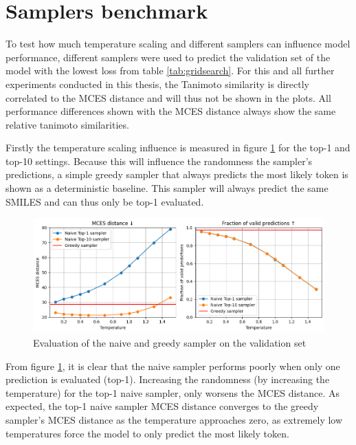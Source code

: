 \section{Samplers benchmark}

To test how much temperature scaling and different samplers can influence model performance, different samplers were used to predict the validation set of the model with the lowest loss from table \ref{tab:gridsearch}.
For this and all further experiments conducted in this thesis, the Tanimoto similarity is directly correlated to the MCES distance and will thus not be shown in the plots.
All performance differences shown with the MCES distance always show the same relative tanimoto similarities.

Firstly the temperature scaling influence is measured in figure \ref{fig:naive_and_greedy} for the top-1 and top-10 settings.
Because this will influence the randomness the sampler's predictions, a simple greedy sampler that always predicts the most likely token is shown as a deterministic baseline.
This sampler will always predict the same SMILES and can thus only be top-1 evaluated.

\begin{figure}[h]
    \centering
    \includegraphics[width=1.0\textwidth]{figures/results/samplers/naive_and_greedy.png}
    \caption{Evaluation of the naive and greedy sampler on the validation set}
    \label{fig:naive_and_greedy}
\end{figure}

From figure \ref{fig:naive_and_greedy}, it is clear that the naive sampler performs poorly when only one prediction is evaluated (top-1).
Increasing the randomness (by increasing the temperature) for the top-1 naive sampler, only worsens the MCES distance.
As expected, the top-1 naive sampler MCES distance converges to the greedy sampler's MCES distance as the temperature approaches zero, as extremely low temperatures force the model to only predict the most likely token.

